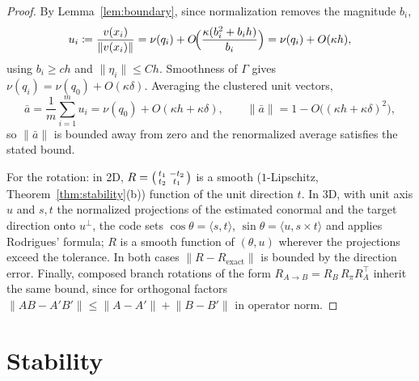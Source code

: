 \documentclass[11pt]{article}
\newcommand{\norm}[1]{\lVert #1 \rVert}
\newcommand{\ip}[2]{\langle #1, #2 \rangle}
\begin{document}
\begin{proof}
By Lemma~\ref{lem:boundary}, since normalization removes the magnitude
$b_i$,
\[
  u_i \coloneqq \frac{v(x_i)}{\norm{v(x_i)}}
  = \nu(q_i) + O\!\Bigl(\frac{\kappa(b_i^2+b_i h)}{b_i}\Bigr)
  = \nu(q_i) + O(\kappa h),
\]
using $b_i\ge ch$ and $\norm{\eta_i}\le Ch$. Smoothness of $\Gamma$
gives $\nu(q_i)=\nu(q_0)+O(\kappa\delta)$. Averaging the clustered unit
vectors,
\[
  \bar a = \frac1m\sum_{i=1}^m u_i
  = \nu(q_0) + O(\kappa h + \kappa\delta),
  \qquad
  \norm{\bar a} = 1 - O\bigl((\kappa h+\kappa\delta)^2\bigr),
\]
so $\norm{\bar a}$ is bounded away from zero and the renormalized
average satisfies the stated bound.

For the rotation: in 2D,
$R=\begin{psmallmatrix} t_1 & -t_2\\ t_2 & t_1\end{psmallmatrix}$ is a
smooth ($1$-Lipschitz, Theorem~\ref{thm:stability}(b)) function of the
unit direction $t$. In 3D, with unit axis $u$ and $s,t$ the normalized
projections of the estimated conormal and the target direction onto
$u^\perp$, the code sets $\cos\theta=\ip{s}{t}$,
$\sin\theta=\ip{u}{s\times t}$ and applies Rodrigues' formula; $R$ is a
smooth function of $(\theta,u)$ wherever the projections exceed the
tolerance. In both cases $\norm{R-R_{\mathrm{exact}}}$ is bounded by the
direction error. Finally, composed branch rotations of the form
$R_{A\to B}=R_B\,R_\pi R_A^{\top}$ inherit the same bound, since for
orthogonal factors $\norm{AB-A'B'}\le\norm{A-A'}+\norm{B-B'}$ in
operator norm.
\end{proof}

\section{Stability}
\end{document}
